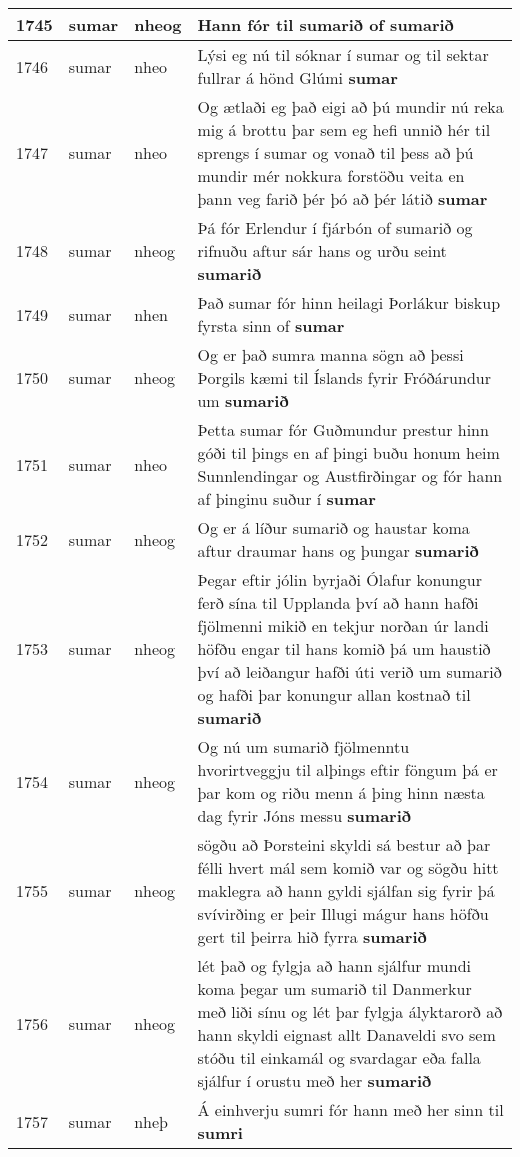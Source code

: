 \documentclass{article}
\begin{document}
\begin{longtable}{p{1cm}|p{1cm}|p{1cm}|p{13cm}}
\hline
1745&sumar&nheog&Hann fór til \textbf{sumarið} of sumarið\\
\hline
1746&sumar&nheo&Lýsi eg nú til sóknar í sumar og til sektar fullrar á hönd Glúmi \textbf{sumar} \\
\hline
1747&sumar&nheo&Og ætlaði eg það eigi að þú mundir nú reka mig á brottu þar sem eg hefi unnið hér til sprengs í sumar og vonað til þess að þú mundir mér nokkura forstöðu veita en þann veg farið þér þó að þér látið \textbf{sumar} \\
\hline
1748&sumar&nheog&Þá fór Erlendur í fjárbón of sumarið og rifnuðu aftur sár hans og urðu seint \textbf{sumarið} \\
\hline
1749&sumar&nhen&Það sumar fór hinn heilagi Þorlákur biskup fyrsta sinn of \textbf{sumar} \\
\hline
1750&sumar&nheog&Og er það sumra manna sögn að þessi Þorgils kæmi til Íslands fyrir Fróðárundur um \textbf{sumarið} \\
\hline
1751&sumar&nheo&Þetta sumar fór Guðmundur prestur hinn góði til þings en af þingi buðu honum heim Sunnlendingar og Austfirðingar og fór hann af þinginu suður í \textbf{sumar} \\
\hline
1752&sumar&nheog&Og er á líður sumarið og haustar koma aftur draumar hans og þungar \textbf{sumarið} \\
\hline
1753&sumar&nheog&Þegar eftir jólin byrjaði Ólafur konungur ferð sína til Upplanda því að hann hafði fjölmenni mikið en tekjur norðan úr landi höfðu engar til hans komið þá um haustið því að leiðangur hafði úti verið um sumarið og hafði þar konungur allan kostnað til \textbf{sumarið} \\
\hline
1754&sumar&nheog&Og nú um sumarið fjölmenntu hvorirtveggju til alþings eftir föngum þá er þar kom og riðu menn á þing hinn næsta dag fyrir Jóns messu \textbf{sumarið} \\
\hline
1755&sumar&nheog&sögðu að Þorsteini skyldi sá bestur að þar félli hvert mál sem komið var og sögðu hitt maklegra að hann gyldi sjálfan sig fyrir þá svívirðing er þeir Illugi mágur hans höfðu gert til þeirra hið fyrra \textbf{sumarið} \\
\hline
1756&sumar&nheog&lét það og fylgja að hann sjálfur mundi koma þegar um sumarið til Danmerkur með liði sínu og lét þar fylgja ályktarorð að hann skyldi eignast allt Danaveldi svo sem stóðu til einkamál og svardagar eða falla sjálfur í orustu með her \textbf{sumarið} \\
\hline
1757&sumar&nheþ&Á einhverju sumri fór hann með her sinn til \textbf{sumri} \\

\end{longtable}
\end{document}
